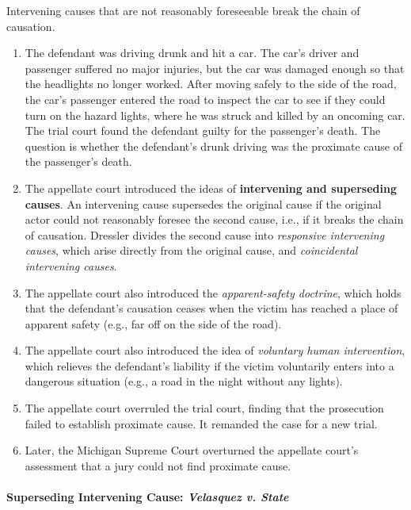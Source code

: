 Intervening causes that are not reasonably foreseeable break the chain of 
causation.

\begin{enumerate}
    \item The defendant was driving drunk and hit a car. The car's driver and 
    passenger suffered no major injuries, but the car was damaged enough so 
    that the headlights no longer worked. After moving safely to the side of 
    the road, the car's passenger entered the road to inspect the car to see 
    if they could turn on the hazard lights, where he was struck and killed by 
    an oncoming car. The trial court found the defendant guilty for the 
    passenger's death. The question is whether the defendant's drunk driving 
    was the proximate cause of the passenger's death.
    \item The appellate court introduced the ideas of \textbf{intervening and 
    superseding causes}. An intervening cause supersedes the original cause if 
    the original actor could not reasonably foresee the second cause, i.e., if 
    it breaks the chain of causation. Dressler divides the second cause into 
    \emph{responsive intervening causes}, which arise directly from the 
    original cause, and \emph{coincidental intervening causes}.
    \item The appellate court also introduced the \emph{apparent-safety 
    doctrine}, which holds that the defendant's causation ceases when the 
    victim has reached a place of apparent safety (e.g., far off on the side 
    of the road).
    \item The appellate court also introduced the idea of \emph{voluntary 
    human intervention}, which relieves the defendant's liability if the 
    victim voluntarily enters into a dangerous situation (e.g., a road in the 
    night without any lights).
    \item The appellate court overruled the trial court, finding that the 
    prosecution failed to establish proximate cause. It remanded the case for 
    a new trial.
    \item Later, the Michigan Supreme Court overturned the appellate court's 
    assessment that a jury could not find proximate cause.
\end{enumerate}

\paragraph{Superseding Intervening Cause: \emph{Velasquez v. State}}

